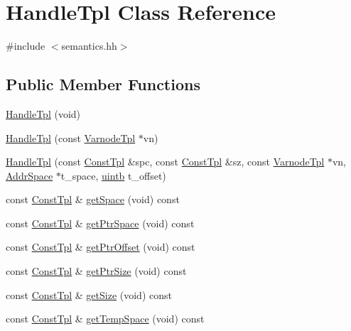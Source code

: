 \hypertarget{class_handle_tpl}{}\section{Handle\+Tpl Class Reference}
\label{class_handle_tpl}


{\ttfamily \#include $<$semantics.\+hh$>$}

\subsection*{Public Member Functions}
\begin{DoxyCompactItemize}
\item 
\mbox{\hyperlink{class_handle_tpl_a5bdfda6439b205a43f905a48e171068f}{Handle\+Tpl}} (void)
\item 
\mbox{\hyperlink{class_handle_tpl_aa0f4a174aa7a805d729d14de077f6e8c}{Handle\+Tpl}} (const \mbox{\hyperlink{class_varnode_tpl}{Varnode\+Tpl}} $\ast$vn)
\item 
\mbox{\hyperlink{class_handle_tpl_a3a807fd582c34e36e82d2183f596929c}{Handle\+Tpl}} (const \mbox{\hyperlink{class_const_tpl}{Const\+Tpl}} \&spc, const \mbox{\hyperlink{class_const_tpl}{Const\+Tpl}} \&sz, const \mbox{\hyperlink{class_varnode_tpl}{Varnode\+Tpl}} $\ast$vn, \mbox{\hyperlink{class_addr_space}{Addr\+Space}} $\ast$t\+\_\+space, \mbox{\hyperlink{types_8h_a2db313c5d32a12b01d26ac9b3bca178f}{uintb}} t\+\_\+offset)
\item 
const \mbox{\hyperlink{class_const_tpl}{Const\+Tpl}} \& \mbox{\hyperlink{class_handle_tpl_a5f4ad63ff134b7f4ccd5e0a850a4b54d}{get\+Space}} (void) const
\item 
const \mbox{\hyperlink{class_const_tpl}{Const\+Tpl}} \& \mbox{\hyperlink{class_handle_tpl_aff10fb854af932febb9d02f585e0f2ad}{get\+Ptr\+Space}} (void) const
\item 
const \mbox{\hyperlink{class_const_tpl}{Const\+Tpl}} \& \mbox{\hyperlink{class_handle_tpl_abdf430c75dc094764836095bd4bc4a8c}{get\+Ptr\+Offset}} (void) const
\item 
const \mbox{\hyperlink{class_const_tpl}{Const\+Tpl}} \& \mbox{\hyperlink{class_handle_tpl_a6c6b9afa686c7e8d76a0b2fc8292db6c}{get\+Ptr\+Size}} (void) const
\item 
const \mbox{\hyperlink{class_const_tpl}{Const\+Tpl}} \& \mbox{\hyperlink{class_handle_tpl_a3c7ffa1d4d9449f2be7b742c66cc3773}{get\+Size}} (void) const
\item 
const \mbox{\hyperlink{class_const_tpl}{Const\+Tpl}} \& \mbox{\hyperlink{class_handle_tpl_a948f2f911e4564fa3f6ef99c335d179d}{get\+Temp\+Space}} (void) const

\end{DoxyCompactItemize}
